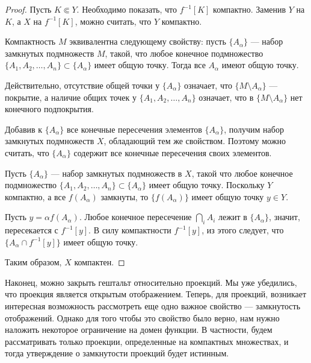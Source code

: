 \begin{proof}
	Пусть \( K \Subset Y \). Необходимо показать, что \( f^{-1}[K] \) компактно. Заменив \( Y \) на \( K \), а \( X \) на \( f^{-1}[K] \), можно считать, что \( Y \) компактно.

	\begin{remark}
		Компактность \( M \) эквивалентна следующему свойству: пусть \( \{A_{\alpha}\} \) — набор замкнутых подмножеств \( M \), такой, что любое конечное подмножество \( \{A_1, A_2, \dots, A_n\} \subset \{A_{\alpha}\} \) имеет общую точку. Тогда все \( A_{\alpha} \) имеют общую точку. 
	\end{remark}

	Действительно, отсутствие общей точки у \( \{A_{\alpha}\} \) означает, что \( \{M \setminus A_{\alpha}\} \) — покрытие, а наличие общих точек у \( \{A_1, A_2, \dots, A_n\} \) означает, что в \( \{M \setminus A_{\alpha}\} \) нет конечного подпокрытия.

	Добавив к \( \{A_{\alpha}\} \) все конечные пересечения элементов \( \{A_{\alpha}\} \), получим набор замкнутых подмножеств \( X \), обладающий тем же свойством. Поэтому можно считать, что \( \{A_{\alpha}\} \) содержит все конечные пересечения своих элементов.

	Пусть \( \{A_{\alpha}\} \) — набор замкнутых подмножеств в \( X \), такой что любое конечное подмножество \( \{A_1, A_2, \dots, A_n\} \subset \{A_{\alpha}\} \) имеет общую точку. Поскольку \( Y \) компактно, а все \( f(A_{\alpha}) \) замкнуты, то \( \{f(A_{\alpha})\} \) имеет общую точку \( y \in Y \).

	Пусть \( y = \alpha f(A_{\alpha}) \). Любое конечное пересечение \( \bigcap_i A_i \) лежит в \( \{A_{\alpha}\} \), значит, пересекается с \( f^{-1}[y] \). В силу компактности \( f^{-1}[y] \), из этого следует, что \( \{A_{\alpha} \cap f^{-1}[y]\} \) имеет общую точку.

	Таким образом, \( X \) компактен.
\end{proof}

Наконец, можно закрыть гештальт относительно проекций. Мы уже убедились, что проекция является открытым отображением. Теперь, для проекций, возникает интересная возможность рассмотреть еще одно важное свойство — замкнутость отображений. Однако для того чтобы это свойство было верно, нам нужно наложить некоторое ограничение на домен функции. В частности, будем рассматривать только проекции, определенные на компактных множествах, и тогда утверждение о замкнутости проекций будет истинным.

